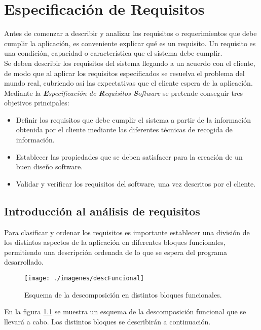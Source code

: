 \chapter{Especificación de Requisitos}
Antes de comenzar a describir y analizar los requisitos o requerimientos que debe cumplir la aplicación, es conveniente explicar qué es un
requisito. Un requisito es una condición, capacidad o característica que el sistema debe cumplir.\\
  
Se deben describir los requisitos del sistema llegando a un acuerdo con el cliente, de modo que al aplicar los requisitos especificados se
resuelva el problema del mundo real, cubriendo así las expectativas que el cliente espera de la aplicación.\\

Mediante la \textit{\textbf{E}specificación de \textbf{R}equisitos \textbf{S}oftware} se pretende conseguir tres objetivos principales:
\begin{itemize}
   \item Definir los requisitos que debe cumplir el sistema a partir de la información obtenida por el cliente mediante las diferentes
   técnicas de recogida de información.
   \item Establecer las propiedades que se deben satisfacer para la creación de un buen diseño software.
   \item Validar y verificar los requisitos del software, una vez descritos por el cliente.\\
\end{itemize}

\section{Introducción al análisis de requisitos}
Para clasificar y ordenar los requisitos es importante establecer una división de los distintos aspectos de la aplicación en diferentes 
bloques funcionales, permitiendo una descripción ordenada de lo que se espera del programa desarrollado. \\
\begin{figure} [H] \begin{center}
   \texttt{[image: ./imagenes/descFuncional]}\label{descFuncional}
   \caption{Esquema de la descomposición en distintos bloques funcionales.}
\end{center} \end{figure}

En la figura \ref{descFuncional} se muestra un esquema de la descomposición funcional que se llevará a cabo. Los distintos bloques se 
describirán a continuación. \\

